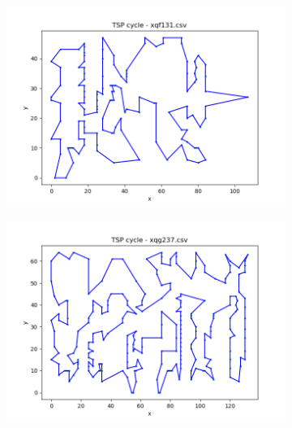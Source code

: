 \documentclass[12pt]{article}
\begin{document}
        \begin{figure}[htpb]
        \centering
            \begin{subfigure}[b]{0.475\textwidth}
                \includegraphics[width=\linewidth]{img/xqf131.png}
            \end{subfigure}
            \hfill
            \begin{subfigure}[b]{0.475\textwidth}
                \includegraphics[width=\linewidth]{img/xqg237.png}
            \end{subfigure}
            \begin{subfigure}[b]{0.475\textwidth}

\end{subfigure}
\end{figure}
\end{document}
